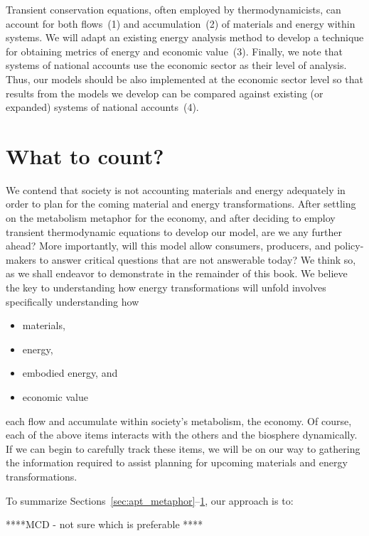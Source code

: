 Transient conservation equations, often employed by thermodynamicists, 
can account for both flows~(1) and accumulation~(2) of materials
and energy within systems.
We will adapt an existing energy analysis method to develop a 
technique for obtaining metrics of energy and economic value~(3).
Finally, we note that systems of national accounts use the economic sector
as their level of analysis. 
Thus, our models should be also implemented at the economic sector level
so that results from the models we develop can be 
compared against existing (or expanded) systems of national accounts~(4).


\section{What to count?}
\label{sec:what_to_count}

We contend that society is not accounting materials and energy adequately 
in order to plan for the coming material and energy transformations.
After settling on the metabolism metaphor for the economy, 
and after deciding to employ transient thermodynamic equations to develop our model, 
are we any further ahead?
More importantly, will this model allow consumers, producers,
and policy-makers to answer critical questions that are not
answerable today? 
We think so, as we shall endeavor to demonstrate in the remainder of this book.
We believe the key to understanding how energy transformations will unfold
involves specifically understanding how

\begin{itemize}
	\item{materials,}
	\item{energy,}
	\item{embodied energy, and}
	\item{economic value}
\end{itemize}

\noindent{}each flow and accumulate within society's metabolism, the economy.
Of course, each of the above items interacts with the others 
and the biosphere dynamically.
If we can begin to carefully track these items, 
we will be on our way to gathering the information required to 
assist planning for upcoming materials and energy transformations.

To summarize Sections~\ref{sec:apt_metaphor}--\ref{sec:what_to_count}, 
our approach is to:

****MCD - not sure which is preferable **** 
 

